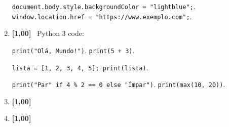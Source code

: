 \documentclass[a4paper]{article}
\newcommand{\pt}                {1,00}  %
\newcommand{\ponto}[1]          {\textbf{[#1]}~}
\begin{document}
\begin{adjmulticols}{2}{0pt}{0pt}
\begin{enumerate}[resume=*questions,label={\arabic*.},leftmargin=*]
\begin{answerlist}[label={\texttt{\Alph*}.},leftmargin=*]
      \ti \lstinline[style=JavaScript]|document.body.style.backgroundColor = "lightblue";|.
      \ti \lstinline[style=JavaScript]|window.location.href = "https://www.exemplo.com";|.
    \end{answerlist}







  \item \rtask \ponto{\pt} \lipsum[1][1-1] Python 3 code:
  
    \begin{answerlist}[label={\texttt{\Alph*}.},leftmargin=*]
      \ti \lstinline[style=Python]|print("Olá, Mundo!")|.
      \ti \lstinline[style=Python]|print(5 + 3)|.
      
      \di \lstinline[style=Python]|lista = [1, 2, 3, 4, 5]; print(lista)|. %
      
      \ti \lstinline[style=Python]|print("Par" if 4 % 2 == 0 else "Ímpar")|.
      \ti \lstinline[style=Python]|print(max(10, 20))|.
    \end{answerlist}


    
    

  \item \rtask \ponto{\pt} \lipsum[1][1-1]
  
    \begin{answerlist}[label={\texttt{\Alph*}.},leftmargin=*]
      \ti \lipsum[1][1]
      \ti \lipsum[1][1]
      \ti \lipsum[1][1]
      \ti \lipsum[1][1]
      
      \di \lipsum[1][1]
    \end{answerlist}


    
  \item \rtask \ponto{\pt} \lipsum[1][1-1]
  
    \begin{answerlist}[label={\texttt{\Alph*}.},leftmargin=*]
      \di \lipsum[1][1]
    
      \ti \lipsum[1][1]
      \ti \lipsum[1][1]
      \ti \lipsum[1][1]
      \ti \lipsum[1][1]
    \end{answerlist}
    

\end{enumerate}
\end{adjmulticols}
\end{document}
